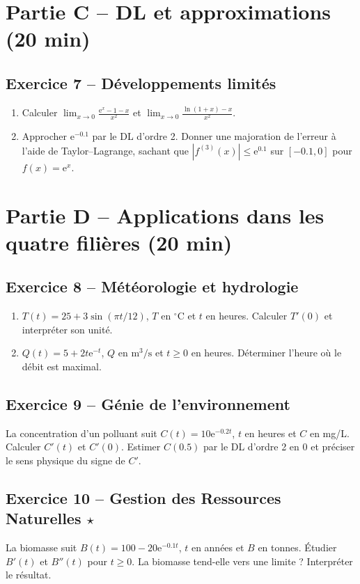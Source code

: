 \documentclass[11pt,a4paper,oneside]{article}
\newcommand{\e}{\mathrm e}
\begin{document}
\section*{Partie C -- DL et approximations (20 min)}
\subsection*{Exercice 7 -- Développements limités}
\begin{enumerate}[label=\alph*)]
\item Calculer $\displaystyle\lim_{x\to0}\frac{\e^x-1-x}{x^2}$ et $\displaystyle\lim_{x\to0}\frac{\ln(1+x)-x}{x^2}$.
\item Approcher $\e^{-0.1}$ par le DL d'ordre 2. Donner une majoration de l'erreur à l'aide de Taylor--Lagrange, sachant que $|f^{(3)}(x)|\le\e^{0.1}$ sur $[-0.1,0]$ pour $f(x)=\e^x$.
\end{enumerate}

\section*{Partie D -- Applications dans les quatre filières (20 min)}
\subsection*{Exercice 8 -- Météorologie et hydrologie}
\begin{enumerate}[label=\alph*)]
\item $T(t)=25+3\sin(\pi t/12)$, $T$ en $^\circ$C et $t$ en heures. Calculer $T'(0)$ et interpréter son unité.
\item $Q(t)=5+2t\e^{-t}$, $Q$ en $\mathrm{m^3/s}$ et $t\ge0$ en heures. Déterminer l'heure où le débit est maximal.
\end{enumerate}

\subsection*{Exercice 9 -- Génie de l'environnement}
La concentration d'un polluant suit $C(t)=10\e^{-0.2t}$, $t$ en heures et $C$ en mg/L. Calculer $C'(t)$ et $C'(0)$. Estimer $C(0.5)$ par le DL d'ordre 2 en $0$ et préciser le sens physique du signe de $C'$.

\subsection*{Exercice 10 -- Gestion des Ressources Naturelles $\star$}
La biomasse suit $B(t)=100-20\e^{-0.1t}$, $t$ en années et $B$ en tonnes. Étudier $B'(t)$ et $B''(t)$ pour $t\ge0$. La biomasse tend-elle vers une limite ? Interpréter le résultat.

\vspace{.3cm}
\end{document}
